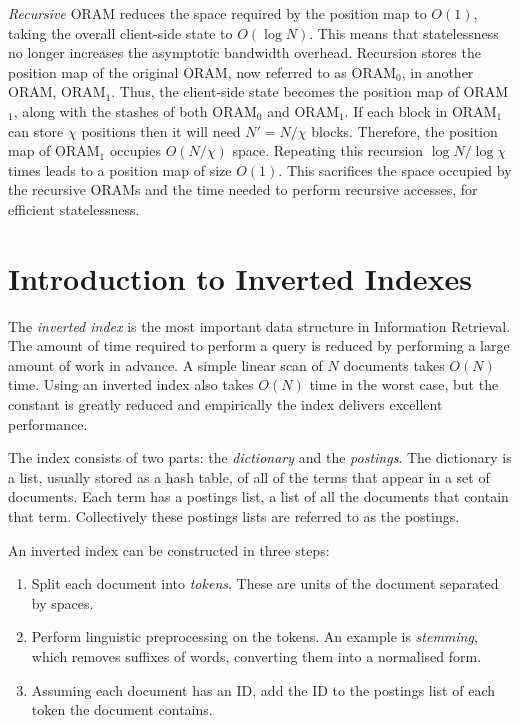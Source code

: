 \documentclass[12pt,a4paper,twoside,openright]{report}
\begin{document}
\emph{Recursive} ORAM reduces the space required by the position map to $O(1)$, taking the overall client-side state to $O(\log N)$. This means that statelessness no longer increases the asymptotic bandwidth overhead. Recursion stores the position map of the original ORAM, now referred to as ORAM$_0$, in another ORAM, ORAM$_1$. Thus, the client-side state becomes the position map of ORAM$_1$, along with the stashes of both ORAM$_0$ and ORAM$_1$. If each block in ORAM$_1$ can store $\chi$ positions then it will need $N' = N/\chi$ blocks. Therefore, the position map of ORAM$_1$ occupies $O(N/\chi)$ space. Repeating this recursion $\log N / \log \chi$ times leads to a position map of size $O(1)$. This sacrifices the space occupied by the recursive ORAMs and the time needed to perform recursive accesses, for efficient statelessness.

\section{Introduction to Inverted Indexes}
\label{sec:invertedindexintro}

The \emph{inverted index} is the most important data structure in Information Retrieval. The amount of time required to perform a query is reduced by performing a large amount of work in advance. A simple linear scan of $N$ documents takes $O(N)$ time. Using an inverted index also takes $O(N)$ time in the worst case, but the constant is greatly reduced and empirically the index delivers excellent performance.

The index consists of two parts: the \emph{dictionary} and the \emph{postings}. The dictionary is a list, usually stored as a hash table, of all of the terms that appear in a set of documents. Each term has a postings list, a list of all the documents that contain that term. Collectively these postings lists are referred to as the postings.

An inverted index can be constructed in three steps:
\begin{enumerate}
    \item Split each document into \emph{tokens}. These are units of the document separated by spaces.
    \item Perform linguistic preprocessing on the tokens. An example is \emph{stemming}, which removes suffixes of words, converting them into a normalised form.
    \item Assuming each document has an ID, add the ID to the postings list of each token the document contains.
\end{enumerate}
\end{document}
